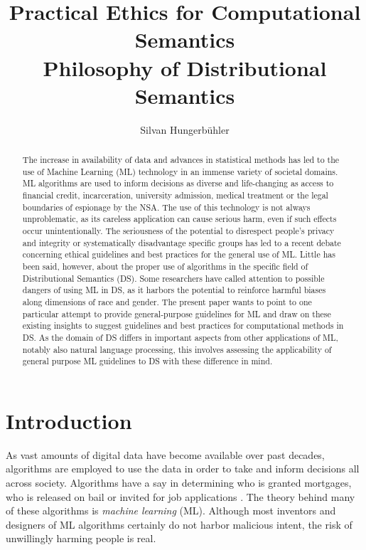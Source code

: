 \documentclass{article}
\title{Practical Ethics for Computational Semantics\\
\large Philosophy of Distributional Semantics}
\date{}
\author{Silvan Hungerb{\"u}hler}
\begin{document}
\maketitle
\begin{abstract}
The increase in availability of data and advances in statistical methods has led to the use of Machine Learning (ML) technology in an immense variety of societal domains. ML algorithms are used to inform decisions as diverse and life-changing as access to financial credit, incarceration, university admission, medical treatment or the legal boundaries of espionage by the NSA.
The use of this technology is not always unproblematic, as its careless application can cause serious harm, even if such effects occur unintentionally.
The seriousness of the potential to disrespect people's privacy and integrity or systematically disadvantage specific groups has led to a recent debate concerning ethical guidelines and best practices for the general use of ML.
Little has been said, however, about the proper use of algorithms in the specific field of Distributional Semantics (DS). Some researchers have called attention to possible dangers of using ML in DS, as it harbors the potential to reinforce harmful biases along dimensions of race and gender.
The present paper wants to point to one particular attempt to provide general-purpose guidelines for ML and draw on these existing insights to suggest guidelines and best practices for computational methods in DS.
As the domain of DS differs in important aspects from other applications of ML, notably also natural language processing,
this involves assessing  the applicability of general purpose ML guidelines to DS with these difference in mind.
\end{abstract}
\section{Introduction}
As vast amounts of digital data have become available over past decades, algorithms are employed to use the data in order to take and inform decisions all across society. 
Algorithms have a say in determining who is granted mortgages, who is released on bail or invited for job applications \cite{algorithms2016}.
The theory behind many of these algorithms is \emph{machine learning} (ML).
Although most inventors and designers of ML algorithms certainly do not harbor malicious intent, the risk of unwillingly harming people is real.
\end{document}

